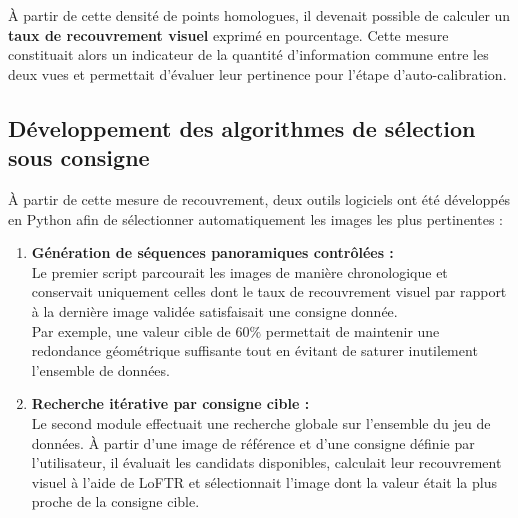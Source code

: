 \documentclass[12pt,a4paper,oneside]{report}
\begin{document}
\hspace*{.3cm}À partir de cette densité de points homologues, il devenait possible de calculer un \textbf{taux de recouvrement visuel} exprimé en pourcentage. Cette mesure constituait alors un indicateur de la quantité d'information commune entre les deux vues et permettait d'évaluer leur pertinence pour l'étape d'auto-calibration.\\

\par\bigskip
\par\bigskip

\subsection{Développement des algorithmes de sélection sous consigne}

\hspace*{.3cm}À partir de cette mesure de recouvrement, deux outils logiciels ont été développés en Python afin de sélectionner automatiquement les images les plus pertinentes :
\begin{enumerate}[label=$\bullet$, itemsep=0.5em]

    \item \textbf{Génération de séquences panoramiques contrôlées :}\\
    Le premier script parcourait les images de manière chronologique et conservait uniquement celles dont le taux de recouvrement visuel par rapport à la dernière image validée satisfaisait une consigne donnée.\\
    Par exemple, une valeur cible de $60\%$ permettait de maintenir une redondance géométrique suffisante tout en évitant de saturer inutilement l'ensemble de données.

    \item \textbf{Recherche itérative par consigne cible :}\\
    Le second module effectuait une recherche globale sur l'ensemble du jeu de données. À partir d'une image de référence et d'une consigne définie par l'utilisateur, il évaluait les candidats disponibles, calculait leur recouvrement visuel à l'aide de LoFTR et sélectionnait l'image dont la valeur était la plus proche de la consigne cible.

\end{enumerate}

\par\bigskip
\par\bigskip
\end{document}
